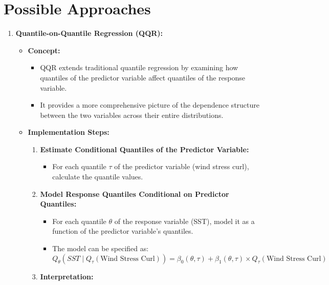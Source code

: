 \documentclass[
  letterpaper,
]{book}
\providecommand{\tightlist}{%
  \setlength{\itemsep}{0pt}\setlength{\parskip}{0pt}}\usepackage{longtable,booktabs,array}
\begin{document}
\section{Possible Approaches}\label{possible-approaches}

\begin{enumerate}
\def\labelenumi{\arabic{enumi}.}
\item
  \textbf{Quantile-on-Quantile Regression (QQR):}

  \begin{itemize}
  \tightlist
  \item
    \textbf{Concept:}

    \begin{itemize}
    \tightlist
    \item
      QQR extends traditional quantile regression by examining how
      quantiles of the predictor variable affect quantiles of the
      response variable.
    \item
      It provides a more comprehensive picture of the dependence
      structure between the two variables across their entire
      distributions.
    \end{itemize}
  \item
    \textbf{Implementation Steps:}

    \begin{enumerate}
    \def\labelenumii{\arabic{enumii}.}
    \tightlist
    \item
      \textbf{Estimate Conditional Quantiles of the Predictor Variable:}

      \begin{itemize}
      \tightlist
      \item
        For each quantile \(\tau\) of the predictor variable (wind
        stress curl), calculate the quantile values.
      \end{itemize}
    \item
      \textbf{Model Response Quantiles Conditional on Predictor
      Quantiles:}

      \begin{itemize}
      \tightlist
      \item
        For each quantile \(\theta\) of the response variable (SST),
        model it as a function of the predictor variable's quantiles.
      \item
        The model can be specified as:
        \[Q_{\theta}(SST \mid Q_{\tau}(\text{Wind Stress Curl})) = \beta_0(\theta, \tau) + \beta_1(\theta, \tau) \times Q_{\tau}(\text{Wind Stress Curl})\]
      \end{itemize}
    \item
      \textbf{Interpretation:}


\end{enumerate}
\end{itemize}
\end{enumerate}
\end{document}
